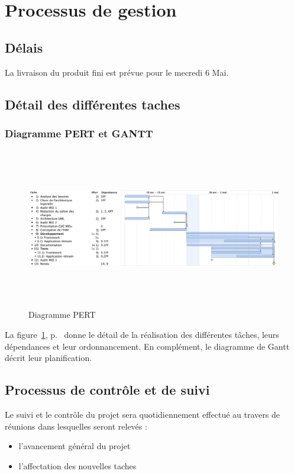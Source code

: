 
\section{Processus de gestion}
\subsection{Délais}
La livraison du produit fini est prévue pour le mecredi 6 Mai.

\subsection{Détail des différentes taches}
\subsubsection{Diagramme PERT et GANTT}
\begin{figure}[thbp]
	\centering
		\includegraphics[height=7cm,angle=90]{../diagrammes/planification.pdf}
	\caption{Diagramme PERT}
	\label{fig:pert}
\end{figure}
La figure~\ref{fig:pert}, p.~\pageref{fig:pert} donne le détail de la réalisation des différentes tâches, leurs dépendances et leur ordonnancement. En complément, le diagramme de Gantt décrit leur planification.

\subsection{Processus de contrôle et de suivi}

Le suivi et le contrôle du projet sera quotidiennement effectué au travers de réunions dans lesquelles seront relevés : 
\begin{itemize}
 \item l'avancement général du projet
 \item l'affectation des nouvelles taches
\end{itemize}

